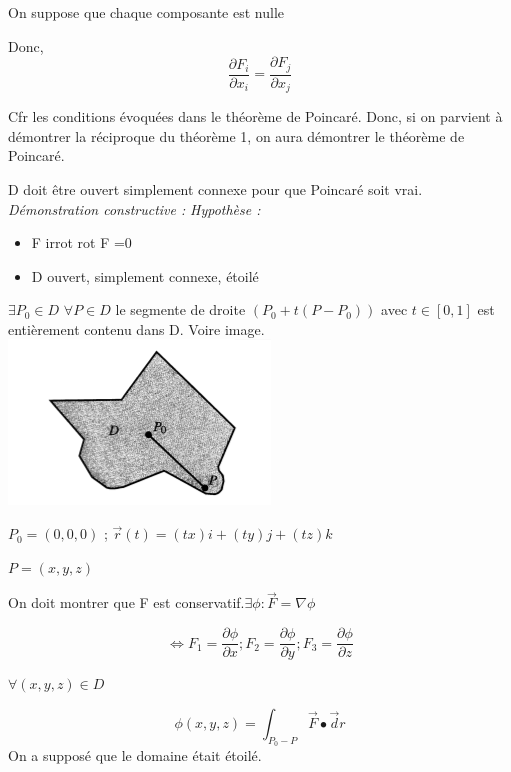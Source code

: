  On suppose que chaque composante est nulle

 Donc,
 \[\frac{\partial F_i}{\partial x_i}=\frac{\partial F_j}{\partial x_j}\]


Cfr les conditions évoquées dans le théorème de Poincaré. Donc, si on parvient à démontrer la réciproque du théorème 1, on aura démontrer le théorème de Poincaré.

D doit être ouvert simplement connexe pour que Poincaré soit vrai.\\




\textit{
Démonstration constructive :}
\textit{
Hypothèse :}

\begin{itemize}
\item F  irrot rot F =0
\item D ouvert, simplement connexe, étoilé
\end{itemize}

\begin{mydef}

$\exists P_0 \in D$
$\forall P \in D $ le segmente de droite $(P_0+t( P-P_0))$ avec $t\in [0,1]$ est entièrement contenu dans D. Voire image.\\

\includegraphics[scale=1]{image2.png}\\
\end{mydef}

$P_0 = (0,0,0)$ ; $\vec r(t) = (tx)i + (ty) j +(tz) k$

$P=(x,y,z)$

On doit montrer que F est conservatif.$\exists \phi : \vec F = \nabla \phi $

\[\Leftrightarrow F_1=\frac{\partial \phi}{\partial x}; F_2=\frac{\partial \phi}{\partial y};F_3=\frac{\partial \phi}{\partial z}\]

$\forall(x,y,z)\in D$

\[\phi(x,y,z) = \int_{P_0-P} \vec F \bullet \vec dr \] On a supposé que le domaine était étoilé.

